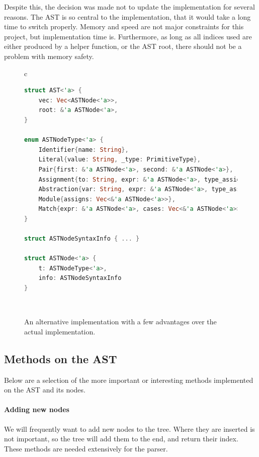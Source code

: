 Despite this, the decision was made not to update the implementation for several reasons. The \ac{AST} is so central to the implementation, that it would take a long time to switch properly. Memory and speed are not major constraints for this project, but implementation time is. Furthermore, as long as all indices used are either produced by a helper function, or the \ac{AST} root, there should not be a problem with memory safety. 

\begin{figure}[t]
    \centering
    \begin{tabular}{c}
        \hline
    \begin{lstlisting}[language=Rust]
struct AST<'a> {
    vec: Vec<ASTNode<'a>>,
    root: &'a ASTNode<'a>,
}

enum ASTNodeType<'a> {
    Identifier{name: String},
    Literal{value: String, _type: PrimitiveType},
    Pair{first: &'a ASTNode<'a>, second: &'a ASTNode<'a>},
    Assignment{to: String, expr: &'a ASTNode<'a>, type_assign: Type},
    Abstraction{var: String, expr: &'a ASTNode<'a>, type_assign: Type},
    Module{assigns: Vec<&'a ASTNode<'a>>},
    Match{expr: &'a ASTNode<'a>, cases: Vec<&'a ASTNode<'a>>}
} 

struct ASTNodeSyntaxInfo { ... }

struct ASTNode<'a> {
    t: ASTNodeType<'a>,
    info: ASTNodeSyntaxInfo
}
    \end{lstlisting}
    \\\hline
    \end{tabular}
    \caption{An alternative implementation with a few advantages over the actual implementation. }
    \label{fig:ast_lst_2}
\end{figure}

\subsection{Methods on the AST}
Below are a selection of the more important or interesting methods implemented on the \ac{AST} and its nodes. 

\paragraph{Adding new nodes} We will frequently want to add new nodes to the tree. Where they are inserted is not important, so the tree will add them to the end, and return their index. These methods are needed extensively for the parser.

